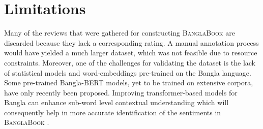 \section{Limitations}
Many of the reviews that were gathered for constructing \textsc{BanglaBook} are discarded because they lack a corresponding rating. A manual annotation process would have yielded a much larger dataset, which was not feasible due to resource constraints. Moreover, one of the challenges for validating the dataset is the lack of statistical models and word-embeddings pre-trained on the Bangla language. Some pre-trained Bangla-BERT models, yet to be trained on extensive corpora, have only recently been proposed. Improving transformer-based models for Bangla can enhance sub-word level contextual understanding which will consequently help in more accurate identification of the sentiments in \textsc{BanglaBook} \cite{islam2022emonoba}.